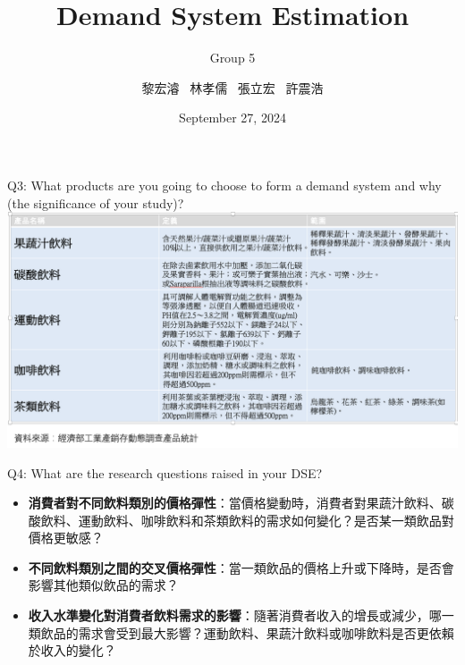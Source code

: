 \documentclass[12pt]{beamer}
\title[]  
{Demand System Estimation}
\subtitle[short subtitle]{Group 5}
\author{黎宏濬 \ 林孝儒 \ 張立宏 \ 許震浩}
\institute[short]{\inst{}Department of Agricultural Economics, NTU}
\date
 {September 27, 2024}
\begin{document}
\begin{frame}{}
    \titlepage
\end{frame}


\begin{frame}{Q3: What products are you going to choose to form a demand system and why (the significance of your study)?}
	\includegraphics[width=1.0\textwidth]{figures/fig.png}
\end{frame}


\begin{frame}{Q4: What are the research questions raised in your DSE?}
	\begin{itemize}
		\item \textbf{消費者對不同飲料類別的價格彈性}：當價格變動時，消費者對果蔬汁飲料、碳酸飲料、運動飲料、咖啡飲料和茶類飲料的需求如何變化？是否某一類飲品對價格更敏感？
		\vspace{0.3cm}
		\item \textbf{不同飲料類別之間的交叉價格彈性}：當一類飲品的價格上升或下降時，是否會影響其他類似飲品的需求？
		\vspace{0.3cm}
		\item \textbf{收入水準變化對消費者飲料需求的影響}：隨著消費者收入的增長或減少，哪一類飲品的需求會受到最大影響？運動飲料、果蔬汁飲料或咖啡飲料是否更依賴於收入的變化？
	\end{itemize}
\end{frame}
\end{document}
